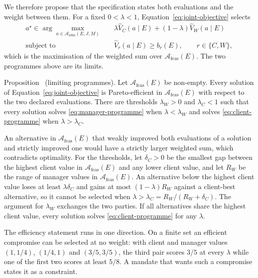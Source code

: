 \documentclass[oneside,10pt,english]{swissi}
\begin{document}
We therefore propose that the specification states both evaluations and the weight between them. For a fixed $0<\lambda<1$, Equation~\eqref{eq:joint-objective} selects
\begin{equation}
 \begin{aligned}
 a^\star\in\arg\max_{a\in\mathcal A_{\mathrm{adm}}(E,J,M)}\quad&
 \lambda\widehat V_C(a\mid E)+(1-\lambda)\widehat V_W(a\mid E)\\
 \text{subject to}\quad&
 \widehat V_r(a\mid E)\ge b_r(E),\qquad r\in\{C,W\},
 \end{aligned}
 \label{eq:joint-objective}
\end{equation}
which is the maximisation of the weighted sum over $\mathcal A_{\mathrm{feas}}(E)$. The two programmes above are its limits.

\begin{samepage}
\label{prop:limits}
Proposition~\thetheorem{} (limiting programmes). Let $\mathcal A_{\mathrm{feas}}(E)$ be non-empty. Every solution of Equation~\eqref{eq:joint-objective} is Pareto-efficient in $\mathcal A_{\mathrm{feas}}(E)$ with respect to the two declared evaluations. There are thresholds $\lambda_W>0$ and $\lambda_C<1$ such that every solution solves \eqref{eq:manager-programme} when $\lambda<\lambda_W$ and solves \eqref{eq:client-programme} when $\lambda>\lambda_C$.

\nopagebreak[4]
An alternative in $\mathcal A_{\mathrm{feas}}(E)$ that weakly improved both evaluations of a solution and strictly improved one would have a strictly larger weighted sum, which contradicts optimality. For the thresholds, let $\delta_C>0$ be the smallest gap between the highest client value in $\mathcal A_{\mathrm{feas}}(E)$ and any lower client value, and let $R_W$ be the range of manager values in $\mathcal A_{\mathrm{feas}}(E)$. An alternative below the highest client value loses at least $\lambda\delta_C$ and gains at most $(1-\lambda)R_W$ against a client-best alternative, so it cannot be selected when $\lambda>\lambda_C=R_W/(R_W+\delta_C)$. The argument for $\lambda_W$ exchanges the two parties. If all alternatives share the highest client value, every solution solves \eqref{eq:client-programme} for any $\lambda$.
\par
\end{samepage}

The efficiency statement runs in one direction. On a finite set an efficient compromise can be selected at no weight: with client and manager values $(1,1/4)$, $(1/4,1)$ and $(3/5,3/5)$, the third pair scores $3/5$ at every $\lambda$ while one of the first two scores at least $5/8$. A mandate that wants such a compromise states it as a constraint.
\end{document}

